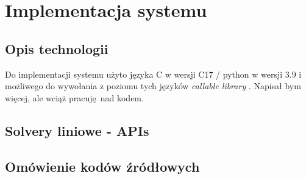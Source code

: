 \chapter{Implementacja systemu}
\thispagestyle{chapterBeginStyle}

\section{Opis technologii}



Do implementacji systemu użyto języka C w wersji C17 / python w wersji 3.9 i możliwego do wywołania z poziomu tych języków \textit{callable library} \cite{GLPK_API}.
Napisał bym więcej, ale wciąż pracuję nad kodem.


\section{Solvery liniowe - APIs}
\section{Omówienie kodów źródłowych}
